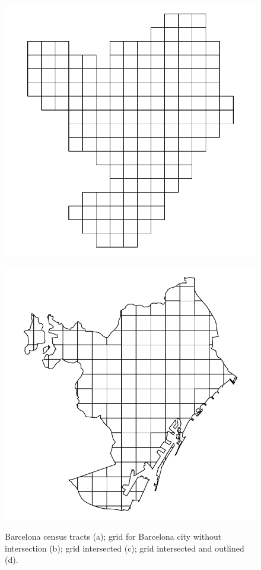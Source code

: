 \begin{figure}[ht!]
\begin{minipage}[b]{0.24\linewidth}
    \subcaption{}
    \label{fig:Fig9b}
  \end{minipage}
  \begin{minipage}[b]{0.24\linewidth}
    \includegraphics[width=\linewidth]{images/Fig9c}
    \subcaption{}
    \label{fig:Fig9c}
  \end{minipage}
  \begin{minipage}[b]{0.24\linewidth}
    \includegraphics[width=\linewidth]{images/Fig9d}
    \subcaption{}
    \label{fig:Fig9d}
  \end{minipage}
  \caption{Barcelona census tracts (a); grid for Barcelona city without intersection (b); grid intersected (c); grid intersected and outlined (d).}
  \label{fig:Fig9}
\end{figure}

